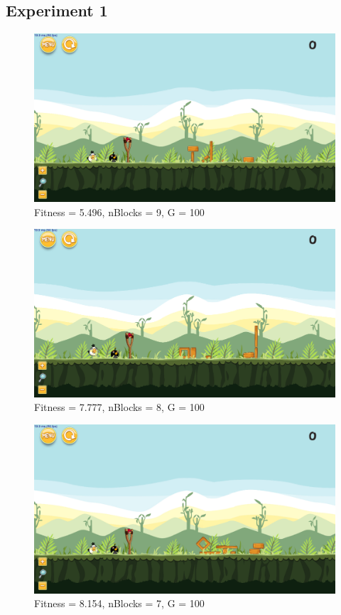 \subsection{Experiment 1}\label{a:e1}

\begin{figure}[H]
	\centering
	\includegraphics[scale=0.35]{gfx/e1/level-0-180522_171359.png}
	\caption{Fitness = 5.496, nBlocks = 9, G = 100 }\label{f:e1-1}
\end{figure}

\begin{figure}[H]
	\centering
	\includegraphics[scale=0.35]{gfx/e1/level-0-180522_183913.png}
	\caption{Fitness = 7.777, nBlocks = 8, G = 100 }\label{f:e1-2}
\end{figure}

\begin{figure}[H]
	\centering
	\includegraphics[scale=0.35]{gfx/e1/level-0-180523_194214.png}
	\caption{Fitness = 8.154, nBlocks = 7, G = 100 }\label{f:e1-3}
\end{figure}

